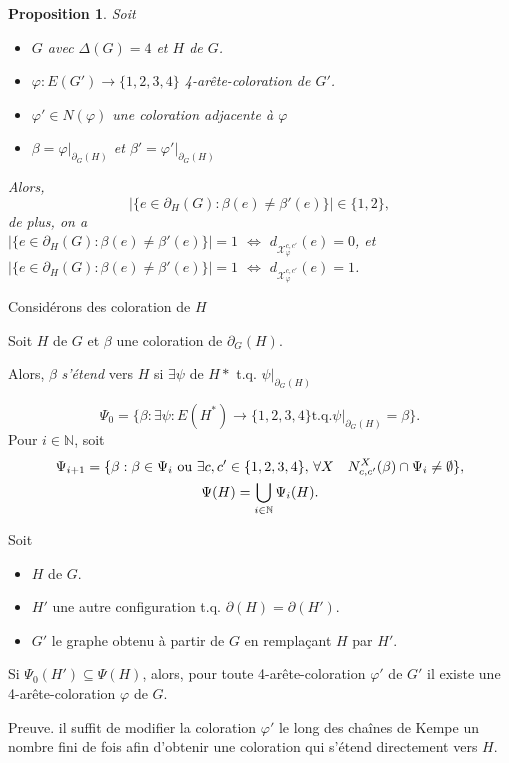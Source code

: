 \documentclass{beamer}
\newtheorem{proposition}{Proposition}
\begin{document}
\begin{frame}
\begin{proposition}
Soit 
\begin{itemize}
\item $G$ avec $\Delta(G)=4$ et $H$  de $G$.
\item $\varphi:E(G')\to \{1,2,3,4\}$ 4-arête-coloration de $G'$. 
\item $\varphi' \in N(\varphi)$ une coloration adjacente à $\varphi$
\item $\beta = \varphi|_{\partial_G(H)}$ et $\beta' = \varphi'|_{\partial_G(H)}$
\end{itemize}
Alors,
$$
|\{e\in \partial_H(G) : \beta(e)\ne \beta'(e)\}| \in \{1,2\},
$$
de plus, on a \\
$|\{e\in \partial_H(G) : \beta(e)\ne \beta'(e)\}|=1$ $\Leftrightarrow$ $d_{\mathcal{X}_{\varphi}^{c,c'}}(e)=0$, et \\
$|\{e\in \partial_H(G) : \beta(e)\ne \beta'(e)\}|=1$ $\Leftrightarrow$ $d_{\mathcal{X}_{\varphi}^{c,c'}}(e)=1$. 
\end{proposition}
\end{frame}

\begin{frame}
Considérons des coloration de $H$ 
\end{frame}

\begin{frame}
Soit $H$ de $G$ et $\beta$ une coloration de $\partial_G(H)$. 

Alors, $\beta$ \emph{s'étend} vers $H$ si $\exists \psi$ de $H*$ t.q. $\psi|_{\partial_G(H)}$

$$
\Psi_0 = \{\beta : \exists \psi : E(H^*)\to\{1,2,3,4\} \textrm{t.q.} \psi|_{\partial_G(H)} = \beta\}.
$$
Pour $i\in\mathbb{N}$, soit
$$
\gathered
\Psi_{i+1} = 
\{ 
\beta : 
\beta\in \Psi_i
\textrm{ ou }
\exists c,c'\in \{1,2,3,4\},\, 
\forall X \quad
N^X_{c,c'}(\beta) \cap \Psi_i \neq \emptyset 
\},\\
\Psi(H)=\bigcup_{i\in \mathbb{N}} \Psi_i(H).
\endgathered
$$
\end{frame}

\begin{frame}
\begin{theorem}
Soit 
\begin{itemize}
\item $H$  de $G$. 
\item $H'$ une autre configuration t.q. $\partial(H)=\partial(H')$.
\item $G'$ le graphe obtenu à partir de $G$ en remplaçant $H$ par $H'$.
\end{itemize}

Si $\Psi_0(H')\subseteq \Psi(H)$, alors, pour toute 4-arête-coloration $\varphi'$ de $G'$ il existe une 4-arête-coloration $\varphi$ de $G$.
\label{th:red}
\end{theorem}

Preuve.
il suffit de modifier la coloration $\varphi'$ le long des chaînes de Kempe un nombre fini de fois afin d'obtenir une coloration qui s'étend directement vers $H$.
\end{frame}
\end{document}
